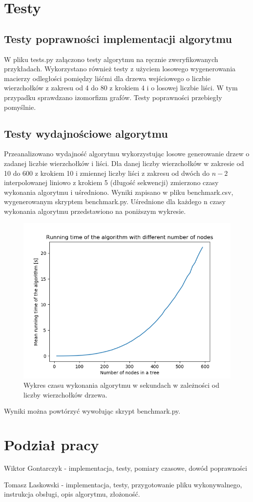 \documentclass[a4paper,12p]{article}
\begin{document}
\section{Testy}

\subsection{Testy poprawności implementacji algorytmu}

W pliku tests.py załączono testy algorytmu na ręcznie zweryfikowanych przykładach. Wykorzystano również testy z użyciem losowego wygenerowania macierzy odległości pomiędzy liśćmi dla drzewa wejściowego o liczbie wierzchołków z zakresu od 4 do 80 z krokiem 4 i o losowej liczbie liści. W tym przypadku sprawdzano izomorfizm grafów. Testy poprawności przebiegły pomyślnie.


\subsection{Testy wydajnościowe algorytmu}

Przeanalizowano wydajność algorytmu wykorzystując losowe generowanie drzew o zadanej liczbie wierzchołków i liści. Dla danej liczby wierzchołków w zakresie od 10 do 600 z krokiem 10 i zmiennej liczby liści z zakresu od dwóch do $n-2$ interpolowanej liniowo z krokiem 5 (długość sekwencji) zmierzono czasy wykonania algorytmu i uśredniono. Wyniki zapisano w pliku benchmark.csv, wygenerowanym skryptem benchmark.py.
Uśrednione dla każdego n czasy wykonania algorytmu przedstawiono na poniższym wykresie.

\begin{figure}[H]
    \centering
    \includegraphics[width=.9\textwidth]{benchmark.png}
    \caption{Wykres czasu wykonania algorytmu w sekundach w zależności od liczby wierzchołków drzewa.}
    \label{fig:mesh1}
\end{figure}

Wyniki można powtórzyć wywołując skrypt benchmark.py.

\section{Podział pracy}

Wiktor Gontarczyk - implementacja, testy, pomiary czasowe, dowód poprawności

Tomasz Laskowski - implementacja, testy, przygotowanie pliku wykonywalnego, instrukcja obsługi, opis algorytmu, złożoność.
\end{document}
